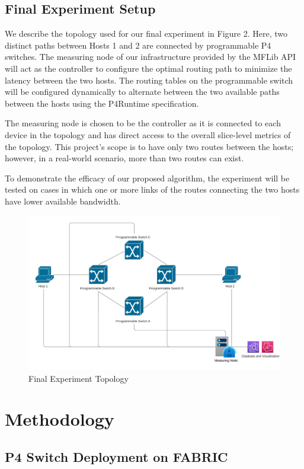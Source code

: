 \documentclass[conference]{IEEEtran}
\begin{document}
    \subsection{Final Experiment Setup}
    We describe the topology used for our final experiment in Figure 2. Here, two distinct paths between Hosts 1 and 2 are connected by programmable P4 switches. The measuring node of our infrastructure provided by the MFLib API will act as the controller to configure the optimal routing path to minimize the latency between the two hosts. The routing tables on the programmable switch will be configured dynamically to alternate between the two available paths between the hosts using the P4Runtime specification. 
    
    The measuring node is chosen to be the controller as it is connected to each device in the topology and has direct access to the overall slice-level metrics of the topology. This project's scope is to have only two routes between the hosts; however, in a real-world scenario, more than two routes can exist.
    
    To demonstrate the efficacy of our proposed algorithm, the experiment will be tested on cases in which one or more links of the routes connecting the two hosts have lower available bandwidth.
    \begin{figure}[h!]
        \centering
        \includegraphics[scale=0.4]{Final_Switch_Topology.jpeg}
        \caption{Final Experiment Topology}
    \end{figure}
     
    \section{Methodology}
    \subsection{P4 Switch Deployment on FABRIC}
    	
\end{document}
